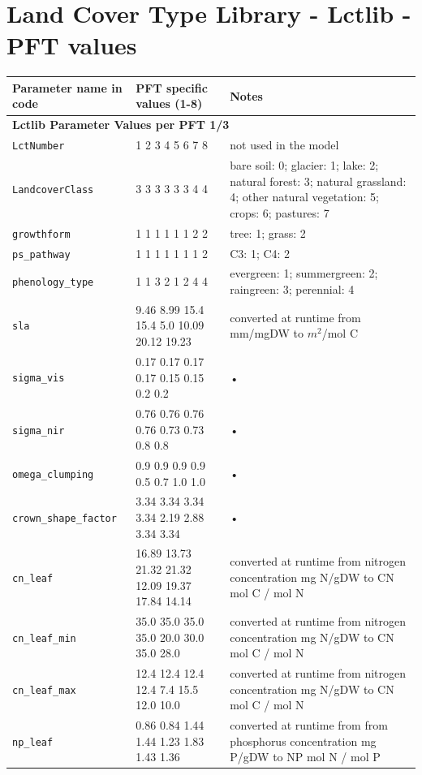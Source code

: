 \newpage
\section{Land Cover Type Library - Lctlib - PFT values}\label{sec:lctlib_pft_values}


\begin{table}
\begin{tabularx}{\linewidth}{|l|l|X|} %
\hline 
Parameter name in code & PFT specific values (1-8) & Notes \\ 
\hline 

\multicolumn{3}{l}{\bf Lctlib Parameter Values per PFT 1/3}\\
\hline
\texttt{LctNumber} & 1 2 3 4 5 6 7 8 & not used in the model \\
\texttt{LandcoverClass} & 3 3 3 3 3 3 4 4 & bare soil: 0; glacier: 1; lake: 2; natural forest: 3; natural grassland: 4; other natural vegetation: 5; crops: 6; pastures: 7 \\
\texttt{growthform} & 1 1 1 1 1 1 2 2 & tree: 1; grass: 2 \\
\texttt{ps\_pathway} & 1 1 1 1 1 1 1 2 & C3: 1; C4: 2 \\
\texttt{phenology\_type} & 1 1 3 2 1 2 4 4 & evergreen: 1; summergreen: 2; raingreen: 3; perennial: 4 \\
\texttt{sla} & 9.46 8.99 15.4 15.4 5.0 10.09 20.12 19.23 & converted at runtime from mm/mgDW to $m^2$/mol C \\
\texttt{sigma\_vis} & 0.17 0.17 0.17 0.17 0.15 0.15 0.2 0.2 & • \\
\texttt{sigma\_nir} & 0.76 0.76 0.76 0.76 0.73 0.73 0.8 0.8 & • \\
\texttt{omega\_clumping} & 0.9 0.9 0.9 0.9 0.5 0.7 1.0 1.0 & • \\
\texttt{crown\_shape\_factor} & 3.34 3.34 3.34 3.34 2.19 2.88 3.34 3.34 & • \\
\texttt{cn\_leaf} & 16.89 13.73 21.32 21.32 12.09 19.37 17.84 14.14 & converted at runtime from nitrogen concentration mg N/gDW to CN mol C / mol N \\
\texttt{cn\_leaf\_min} & 35.0 35.0 35.0 35.0 20.0 30.0 35.0 28.0 & converted at runtime from nitrogen concentration mg N/gDW to CN mol C / mol N \\
\texttt{cn\_leaf\_max} & 12.4 12.4 12.4 12.4 7.4 15.5 12.0 10.0 & converted at runtime from nitrogen concentration mg N/gDW to CN mol C / mol N \\
\texttt{np\_leaf} & 0.86 0.84 1.44 1.44 1.23 1.83 1.43 1.36 & converted at runtime from from phosphorus concentration mg P/gDW to NP mol N / mol P \\

\end{tabularx}
\end{table}

